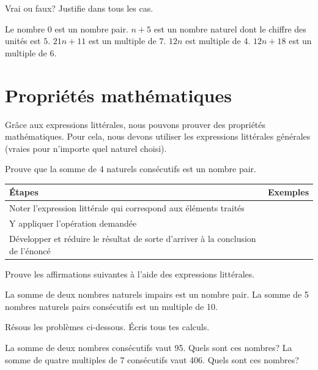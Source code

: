 \documentclass[../math2.tex]{subfiles}
\begin{document}
\begin{exercise}
    Vrai ou faux? Justifie dans tous les cas.
    \begin{tasks}
        \task Le nombre 0 est un nombre pair.
        \task $n + 5$ est un nombre naturel dont le chiffre des unités est $5$.
        \task $21n + 11$ est un multiple de $7$.
        \task $12n$ est multiple de 4.
        \task $12n + 18$ est un multiple de $6$.
    \end{tasks}
\end{exercise}
\newpage
\section{Propriétés mathématiques}

Grâce aux expressions littérales, nous pouvons prouver des propriétés mathématiques. Pour cela, nous devons utiliser les expressions littérales générales (vraies pour n'importe quel naturel choisi).

\exemple
Prouve que la somme de 4 naturels consécutifs est un nombre pair.

    {\renewcommand{\arraystretch}{1.5}
        \begin{tabularx}{\linewidth}{|X|X|}
            \hline
            \textbf{Étapes}                                                                  & \textbf{Exemples} \\
            \hline
            Noter l'expression littérale qui correspond aux éléments traités                 &                   \\
            \hline
            Y appliquer l'opération demandée                                                 &                   \\
            \hline
            Développer et réduire le résultat de sorte d'arriver à la conclusion de l'énoncé &                   \\
            \hline
        \end{tabularx}}

\begin{exercise}
    Prouve les affirmations suivantes à l'aide des expressions littérales.
    \begin{tasks}[after-item-skip=4cm, after-skip=4cm]
        \task La somme de deux nombres naturels impairs est un nombre pair.
        \task La somme de 5 nombres naturels pairs consécutifs est un multiple de 10.
    \end{tasks}
\end{exercise}
\newpage
\begin{exercise}
    Résous les problèmes ci-dessous. Écris tous tes calculs.
    \begin{tasks}[after-item-skip=8cm]
        \task La somme de deux nombres consécutifs vaut 95. Quels sont ces nombres?
        \task La somme de quatre multiples de 7 consécutifs vaut 406. Quels sont ces nombres?
    \end{tasks}
\end{exercise}
\newpage
\end{document}

